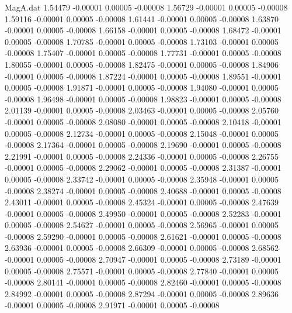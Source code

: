 \begin{filecontents}{MagA.dat}
   1.54479   -0.00001    0.00005   -0.00008
   1.56729   -0.00001    0.00005   -0.00008
   1.59116   -0.00001    0.00005   -0.00008
   1.61441   -0.00001    0.00005   -0.00008
   1.63870   -0.00001    0.00005   -0.00008
   1.66158   -0.00001    0.00005   -0.00008
   1.68472   -0.00001    0.00005   -0.00008
   1.70785   -0.00001    0.00005   -0.00008
   1.73103   -0.00001    0.00005   -0.00008
   1.75407   -0.00001    0.00005   -0.00008
   1.77731   -0.00001    0.00005   -0.00008
   1.80055   -0.00001    0.00005   -0.00008
   1.82475   -0.00001    0.00005   -0.00008
   1.84906   -0.00001    0.00005   -0.00008
   1.87224   -0.00001    0.00005   -0.00008
   1.89551   -0.00001    0.00005   -0.00008
   1.91871   -0.00001    0.00005   -0.00008
   1.94080   -0.00001    0.00005   -0.00008
   1.96498   -0.00001    0.00005   -0.00008
   1.98823   -0.00001    0.00005   -0.00008
   2.01139   -0.00001    0.00005   -0.00008
   2.03463   -0.00001    0.00005   -0.00008
   2.05760   -0.00001    0.00005   -0.00008
   2.08080   -0.00001    0.00005   -0.00008
   2.10418   -0.00001    0.00005   -0.00008
   2.12734   -0.00001    0.00005   -0.00008
   2.15048   -0.00001    0.00005   -0.00008
   2.17364   -0.00001    0.00005   -0.00008
   2.19690   -0.00001    0.00005   -0.00008
   2.21991   -0.00001    0.00005   -0.00008
   2.24336   -0.00001    0.00005   -0.00008
   2.26755   -0.00001    0.00005   -0.00008
   2.29062   -0.00001    0.00005   -0.00008
   2.31387   -0.00001    0.00005   -0.00008
   2.33742   -0.00001    0.00005   -0.00008
   2.35948   -0.00001    0.00005   -0.00008
   2.38274   -0.00001    0.00005   -0.00008
   2.40688   -0.00001    0.00005   -0.00008
   2.43011   -0.00001    0.00005   -0.00008
   2.45324   -0.00001    0.00005   -0.00008
   2.47639   -0.00001    0.00005   -0.00008
   2.49950   -0.00001    0.00005   -0.00008
   2.52283   -0.00001    0.00005   -0.00008
   2.54627   -0.00001    0.00005   -0.00008
   2.56965   -0.00001    0.00005   -0.00008
   2.59290   -0.00001    0.00005   -0.00008
   2.61621   -0.00001    0.00005   -0.00008
   2.63936   -0.00001    0.00005   -0.00008
   2.66309   -0.00001    0.00005   -0.00008
   2.68562   -0.00001    0.00005   -0.00008
   2.70947   -0.00001    0.00005   -0.00008
   2.73189   -0.00001    0.00005   -0.00008
   2.75571   -0.00001    0.00005   -0.00008
   2.77840   -0.00001    0.00005   -0.00008
   2.80141   -0.00001    0.00005   -0.00008
   2.82460   -0.00001    0.00005   -0.00008
   2.84992   -0.00001    0.00005   -0.00008
   2.87294   -0.00001    0.00005   -0.00008
   2.89636   -0.00001    0.00005   -0.00008
   2.91971   -0.00001    0.00005   -0.00008

\end{filecontents}

